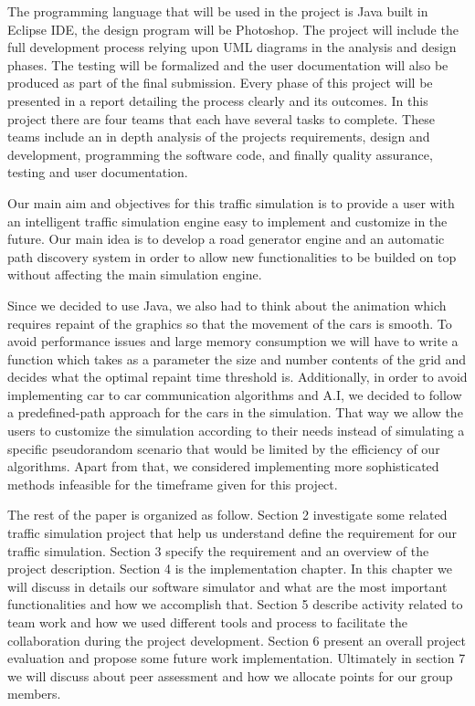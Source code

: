 \documentclass[oneside]{article}
\begin{document}
\noindent The programming language that will be used in the project is Java built in Eclipse IDE, the design program will be Photoshop.
The project will include the full development process relying upon UML diagrams in the analysis and design phases. The testing will be formalized and the user documentation will also be produced as part of the final submission. Every phase of this project will be presented in a report detailing the process clearly and its outcomes.
In this project there are four teams that each have several tasks to complete. These teams include an in depth analysis of the projects requirements, design and development, programming the software code, and finally quality assurance, testing and user documentation. 
\newline 

\noindent Our main aim and objectives for this traffic simulation is to provide a user with an intelligent traffic simulation engine easy to implement and customize in the future. Our main idea is to develop a road generator engine and an automatic path discovery system in order to allow new functionalities to be builded on top without affecting the main simulation engine.
\newline

\noindent Since we decided to use Java, we also had to think about the animation which requires repaint of the graphics so that the movement of the cars is smooth. To avoid performance issues and large memory consumption we will have to write a function which takes as a parameter the size and number contents of the grid and decides what the optimal repaint time threshold is. Additionally, in order to avoid implementing car to car communication algorithms and A.I, we decided to follow a predefined-path approach for the cars in the simulation. That way we allow the users to customize the simulation according to their needs instead of simulating a specific pseudorandom scenario that would be limited by the efficiency of our algorithms. Apart from that, we considered implementing more sophisticated methods infeasible for the timeframe given for this project. 
\newpage

\noindent The rest of the paper is organized as follow. Section 2 investigate some related traffic simulation project that help us understand define the requirement for our traffic simulation. Section 3 specify the requirement and an overview of the project description. Section 4 is the implementation chapter. In this chapter we will discuss in details our software simulator and what are the most important functionalities and how we accomplish that. Section 5 describe activity related to team work and how we used different tools and process to facilitate the collaboration during the project development. Section 6 present an overall project evaluation and propose some future work implementation. Ultimately in section 7 we will discuss about peer assessment and how we allocate points for our group members.
\end{document}
